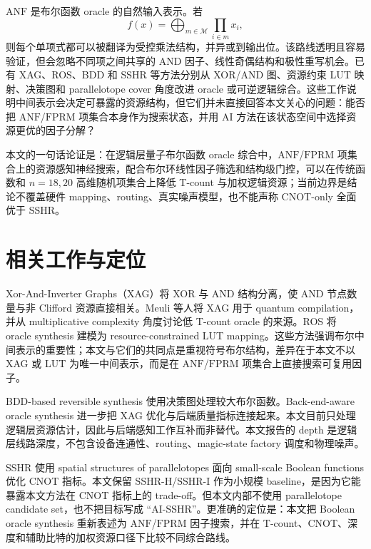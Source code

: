 \documentclass[UTF8,fontset=macnew,11pt]{ctexart}
\newcommand{\anf}{\ensuremath{\mathrm{ANF}}}
\newcommand{\fprm}{\ensuremath{\mathrm{FPRM}}}
\begin{document}
\anf{} 是布尔函数 oracle 的自然输入表示。若
\begin{equation}
  f(x)=\bigoplus_{m\in\mathcal{M}}\prod_{i\in m}x_i ,
  \label{eq:anf}
\end{equation}
则每个单项式都可以被翻译为受控乘法结构，并异或到输出位。该路线透明且容易验证，但会忽略不同项之间共享的 AND 因子、线性奇偶结构和极性重写机会。已有 XAG、ROS、BDD 和 SSHR 等方法分别从 XOR/AND 图、资源约束 LUT 映射、决策图和 parallelotope cover 角度改进 oracle 或可逆逻辑综合\cite{meuli2022xag,meuli2020ros,wille2009bdd,zheng2025sshr}。这些工作说明中间表示会决定可暴露的资源结构，但它们并未直接回答本文关心的问题：能否把 \anf{}/\fprm{} 项集合本身作为搜索状态，并用 AI 方法在该状态空间中选择资源更优的因子分解？

本文的一句话论证是：在逻辑层量子布尔函数 oracle 综合中，\anf{}/\fprm{} 项集合上的资源感知神经搜索，配合布尔环线性因子筛选和结构级门控，可以在传统函数和 $n=18,20$ 高维随机项集合上降低 T-count 与加权逻辑资源；当前边界是结论不覆盖硬件 mapping、routing、真实噪声模型，也不能声称 CNOT-only 全面优于 SSHR。

\section{相关工作与定位}

Xor-And-Inverter Graphs（XAG）将 XOR 与 AND 结构分离，使 AND 节点数量与非 Clifford 资源直接相关。Meuli 等人将 XAG 用于 quantum compilation\cite{meuli2022xag}，并从 multiplicative complexity 角度讨论低 T-count oracle 的来源\cite{meuli2019multiplicative}。ROS 将 oracle synthesis 建模为 resource-constrained LUT mapping\cite{meuli2020ros}。这些方法强调布尔中间表示的重要性；本文与它们的共同点是重视符号布尔结构，差异在于本文不以 XAG 或 LUT 为唯一中间表示，而是在 \anf{}/\fprm{} 项集合上直接搜索可复用因子。

BDD-based reversible synthesis 使用决策图处理较大布尔函数\cite{wille2009bdd}。Back-end-aware oracle synthesis 进一步把 XAG 优化与后端质量指标连接起来\cite{yu2025backend}。本文目前只处理逻辑层资源估计，因此与后端感知工作互补而非替代。本文报告的 depth 是逻辑层线路深度，不包含设备连通性、routing、magic-state factory 调度和物理噪声。

SSHR 使用 spatial structures of parallelotopes 面向 small-scale Boolean functions 优化 CNOT 指标\cite{zheng2025sshr}。本文保留 SSHR-H/SSHR-I 作为小规模 baseline，是因为它能暴露本文方法在 CNOT 指标上的 trade-off。但本文内部不使用 parallelotope candidate set，也不把目标写成 ``AI-SSHR''。更准确的定位是：本文把 Boolean oracle synthesis 重新表述为 \anf{}/\fprm{} 因子搜索，并在 T-count、CNOT、深度和辅助比特的加权资源口径下比较不同综合路线。
\end{document}
